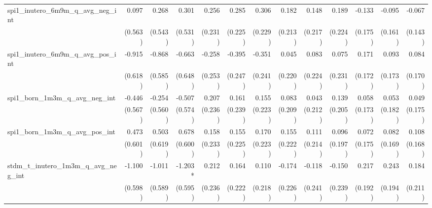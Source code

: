 \begin{tabular}{lrrrrrrrrrrrr}
spi1\_inutero\_6m9m\_q\_avg\_neg\_int       &        0.097 &        0.268 &        0.301 &        0.256 &        0.285 &        0.306 &        0.182 &        0.148 &        0.189 &       -0.133 &       -0.095 &       -0.067 \\ 
                                            &      (0.563) &      (0.543) &      (0.531) &      (0.231) &      (0.225) &      (0.229) &      (0.213) &      (0.217) &      (0.224) &      (0.175) &      (0.161) &      (0.143) \\ 
spi1\_inutero\_6m9m\_q\_avg\_pos\_int       &       -0.915 &       -0.868 &       -0.663 &       -0.258 &       -0.395 &       -0.351 &        0.045 &        0.083 &        0.075 &        0.171 &        0.093 &        0.084 \\ 
                                            &      (0.618) &      (0.585) &      (0.648) &      (0.253) &      (0.247) &      (0.241) &      (0.220) &      (0.224) &      (0.231) &      (0.172) &      (0.173) &      (0.170) \\ 
spi1\_born\_1m3m\_q\_avg\_neg\_int          &       -0.446 &       -0.254 &       -0.507 &        0.207 &        0.161 &        0.155 &        0.083 &        0.043 &        0.139 &        0.058 &        0.053 &        0.049 \\ 
                                            &      (0.567) &      (0.560) &      (0.574) &      (0.236) &      (0.239) &      (0.223) &      (0.209) &      (0.212) &      (0.205) &      (0.173) &      (0.182) &      (0.175) \\ 
spi1\_born\_1m3m\_q\_avg\_pos\_int          &        0.473 &        0.503 &        0.678 &        0.158 &        0.155 &        0.170 &        0.155 &        0.111 &        0.096 &        0.072 &        0.082 &        0.108 \\ 
                                            &      (0.601) &      (0.619) &      (0.600) &      (0.233) &      (0.225) &      (0.223) &      (0.222) &      (0.214) &      (0.197) &      (0.175) &      (0.169) &      (0.168) \\ 
stdm\_t\_inutero\_1m3m\_q\_avg\_neg\_int    &       -1.100 &       -1.011 &      -1.203* &        0.212 &        0.164 &        0.110 &       -0.174 &       -0.118 &       -0.150 &        0.217 &        0.243 &        0.184 \\ 
                                            &      (0.598) &      (0.589) &      (0.595) &      (0.236) &      (0.222) &      (0.218) &      (0.226) &      (0.241) &      (0.239) &      (0.192) &      (0.194) &      (0.211) \\ 

\end{tabular}
